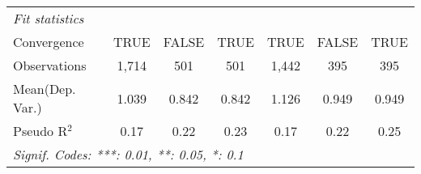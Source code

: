 \begin{tabular}{lcccccc}
   \midrule
   \emph{Fit statistics}\\
   Convergence             &TRUE          & FALSE   & TRUE    & TRUE        & FALSE  & TRUE\\  
   Observations            & 1,714        & 501     & 501     & 1,442       & 395    & 395\\  
Mean(Dep. Var.) & 1.039 & 0.842 & 0.842 & 1.126 & 0.949 & 0.949 \\
   Pseudo R$^2$            & 0.17         & 0.22    & 0.23    & 0.17        & 0.22   & 0.25\\  
   \midrule \midrule
   \multicolumn{7}{l}{\emph{Signif. Codes: ***: 0.01, **: 0.05, *: 0.1}}\\
\end{tabular}
\par\endgroup
